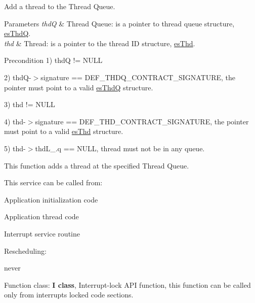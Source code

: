 Add a thread to the Thread Queue. 


\begin{DoxyParams}{Parameters}
{\em thd\-Q} & Thread Queue\-: is a pointer to thread queue structure, \hyperlink{structesThdQ}{es\-Thd\-Q}. \\
\hline
{\em thd} & Thread\-: is a pointer to the thread I\-D structure, \hyperlink{structesThd}{es\-Thd}. \\
\hline
\end{DoxyParams}
\begin{DoxyPrecond}{Precondition}
1) {\ttfamily thd\-Q != N\-U\-L\-L} 

2) {\ttfamily thd\-Q-\/$>$signature == D\-E\-F\-\_\-\-T\-H\-D\-Q\-\_\-\-C\-O\-N\-T\-R\-A\-C\-T\-\_\-\-S\-I\-G\-N\-A\-T\-U\-R\-E}, the pointer must point to a valid \hyperlink{structesThdQ}{es\-Thd\-Q} structure. 

3) {\ttfamily thd != N\-U\-L\-L} 

4) {\ttfamily thd-\/$>$signature == D\-E\-F\-\_\-\-T\-H\-D\-\_\-\-C\-O\-N\-T\-R\-A\-C\-T\-\_\-\-S\-I\-G\-N\-A\-T\-U\-R\-E}, the pointer must point to a valid \hyperlink{structesThd}{es\-Thd} structure. 

5) {\ttfamily thd-\/$>$thd\-L\-\_\-.\-q == N\-U\-L\-L}, thread must not be in any queue.
\end{DoxyPrecond}
This function adds a thread at the specified Thread Queue. \begin{DoxyParagraph}{This service can be called from\-:}

\begin{DoxyItemize}
\item Application initialization code
\item Application thread code
\item Interrupt service routine 
\end{DoxyItemize}
\end{DoxyParagraph}
\begin{DoxyParagraph}{Rescheduling\-:}

\begin{DoxyItemize}
\item never 
\end{DoxyItemize}
\end{DoxyParagraph}
\begin{DoxyParagraph}{Function class\-:}
{\bfseries I class}, Interrupt-\/lock A\-P\-I function, this function can be called only from interrupts locked code sections. 
\end{DoxyParagraph}
